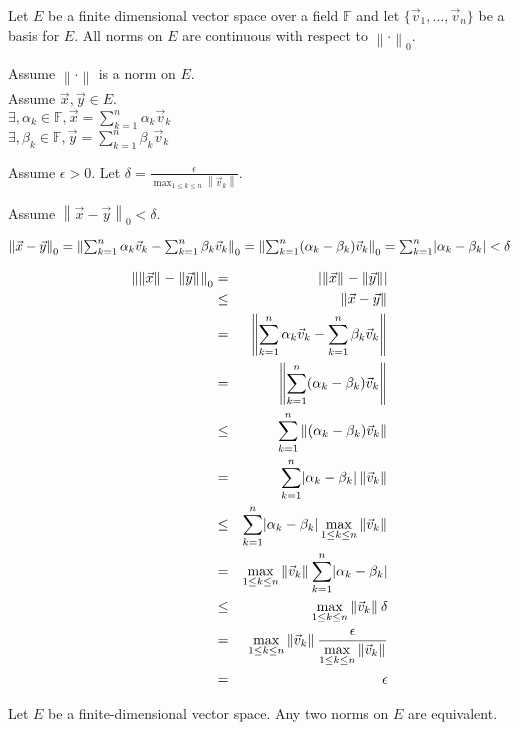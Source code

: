 \documentclass[letterpaper,12pt,fleqn]{article}
\newcommand{\nnorm}[2]{\left\|#1\right\|_{#2}}
\newcommand{\norm}[1]{\nnorm{#1}{}}
\newcommand{\vv}{\vec{v}}
\newcommand{\vx}{\vec{x}}
\newcommand{\vy}{\vec{y}}
\newcommand{\F}{\mathbb{F}}
\renewcommand{\a}{\alpha}
\renewcommand{\b}{\beta}
\newcommand{\e}{\epsilon}
\renewcommand{\d}{\delta}
\begin{document}
\begin{theorem}
  Let $E$ be a finite dimensional vector space over a field $\F$ and let
  $\{\vv_1,\ldots,\vv_n\}$ be a basis for $E$. All norms on $E$ are continuous
  with respect to $\nnorm{\cdot}{0}$.
\end{theorem}

\begin{theproof}
  Assume $\norm{\cdot}$ is a norm on $E$. \\
  Assume $\vx,\vy\in E$. \\
  $\exists,\a_k\in\F,\vx=\sum_{k=1}^n\a_k\vv_k$ \\
  $\exists,\b_k\in\F,\vy=\sum_{k=1}^n\b_k\vv_k$
  
  Assume $\e>0$.
  Let $\d=\frac{\e}{\displaystyle\max_{1\le k\le n}\norm{\vv_k}}$.
  
  Assume $\nnorm{\vx-\vy}{0}<\d$.
  
  $\nnorm{\vx-\vy}{0}=\nnorm{\sum_{k=1}^n\a_k\vv_k-\sum_{k=1}^n\b_k\vv_k}{0}=
  \nnorm{\sum_{k=1}^n(\a_k-\b_k)\vv_k}{0}=\sum_{k=1}^n\abs{\a_k-\b_k}<\d$
  
  \begin{eqnarray*}
    \nnorm{\norm{\vx}-\norm{\vy}}{0} &=& \abs{\norm{\vx}-\norm{\vy}} \\
    &\le& \norm{\vx-\vy} \\
    &=& \norm{\sum_{k=1}^n\a_k\vv_k-\sum_{k=1}^n\b_k\vv_k} \\
    &=& \norm{\sum_{k=1}^n(\a_k-\b_k)\vv_k} \\
    &\le& \sum_{k=1}^n\norm{(\a_k-\b_k)\vv_k} \\
    &=& \sum_{k=1}^n\abs{\a_k-\b_k}\norm{\vv_k} \\
    &\le& \sum_{k=1}^n\abs{\a_k-\b_k}\max_{1\le k\le n}\norm{\vv_k} \\
    &=& \max_{1\le k\le n}\norm{\vv_k}\sum_{k=1}^n\abs{\a_k-\b_k} \\
    &\le& \max_{1\le k\le n}\norm{\vv_k}\d \\
    &=& \max_{1\le k\le n}\norm{\vv_k}
    \frac{\e}{\displaystyle\max_{1\le k\le n}\norm{\vv_k}} \\
    &=& \e
  \end{eqnarray*}
\end{theproof}

\begin{theorem}
  Let $E$ be a finite-dimensional vector space. Any two norms on $E$ are
  equivalent.
\end{theorem}
\end{document}
